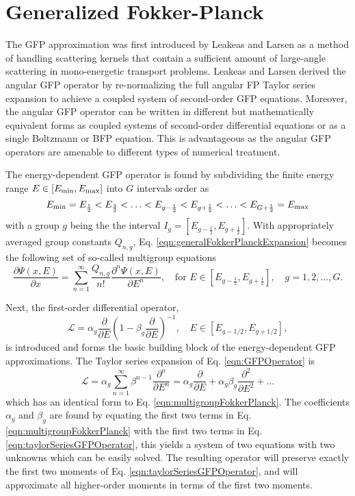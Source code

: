 
\section{Generalized Fokker-Planck}
The GFP approximation was first introduced by Leakeas and Larsen \cite{leakeas-2001} as a method of handling scattering kernels that contain a sufficient amount of large-angle scattering in mono-energetic transport problems. Leakeas and Larsen derived the angular GFP operator by re-normalizing the full angular FP Taylor series expansion to achieve a coupled system of second-order GFP equations. Moreover, the angular GFP operator can be written in different but mathematically equivalent forms as coupled systems of second-order differential equations or as a single Boltzmann or BFP equation. This is advantageous as the angular GFP operators are amenable to different types of numerical treatment.

The energy-dependent GFP operator is found by subdividing the finite energy range $E \in [E_{\text{min}}, E_{\text{max}}]$ into $G$ intervals order as 
\begin{equation}
  E_{\text{min}} = E_{\frac{1}{2}} < E_{\frac{3}{2}} < \ldots < E_{g-\frac{1}{2}} < E_{g+\frac{1}{2}} < \ldots < E_{G+\frac{1}{2}} = E_{\text{max}}
\end{equation}
with a group $g$ being the the interval $I_g = [E_{g-\frac{1}{2}}, E_{g+\frac{1}{2}}]$. With appropriately averaged group constants $Q_{n,g}$, Eq. \eqref{eqn:generalFokkerPlanckExpansion} becomes the following set of so-called multigroup equations
\begin{equation} \label{eqn:multigroupFokkerPlanck}
  \dfrac{\partial \Psi(x,E)}{\partial x} = \sum_{n=1}^{\infty} \dfrac{Q_{n,g}}{n !} \dfrac{\partial^n \Psi(x,E) }{\partial E^n}, \quad \text{for} \,\, E \in [E_{g-\frac{1}{2}}, E_{g+\frac{1}{2}}], \quad g = 1,2,\ldots,G.
\end{equation}

Next, the first-order differential operator,
\begin{equation} \label{eqn:GFPOperator}
  \mathcal{L} = \alpha_g \dfrac{\partial}{\partial E} \left(1 - \beta_g \dfrac{\partial}{\partial E}\right)^{-1}, \quad E \in [E_{g-1/2}, E_{g+1/2}],
\end{equation}
is introduced and forms the basic building block of the energy-dependent GFP approximations. The Taylor series expansion of Eq. \eqref{eqn:GFPOperator} is
\begin{equation} \label{eqn:taylorSeriesGFPOperator}
  \mathcal{L} = \alpha_g \sum_{n=1}^{\infty} \beta^{n-1} \dfrac{\partial^n}{\partial E^n} = \alpha_g \dfrac{\partial}{\partial E} + \alpha_g \beta_g \dfrac{\partial^2}{\partial E^2} + \ldots
\end{equation}
which has an identical form to Eq. \eqref{eqn:multigroupFokkerPlanck}. The coefficients $\alpha_g$ and $\beta_g$ are found by equating the first two terms in Eq. \eqref{eqn:multigroupFokkerPlanck} with the first two terms in Eq. \eqref{eqn:taylorSeriesGFPOperator}, this yields a system of two equations with two unknowns which can be easily solved. The resulting operator will preserve exactly the first two moments of Eq. \eqref{eqn:taylorSeriesGFPOperator}, and will approximate all higher-order moments in terms of the first two moments. 

